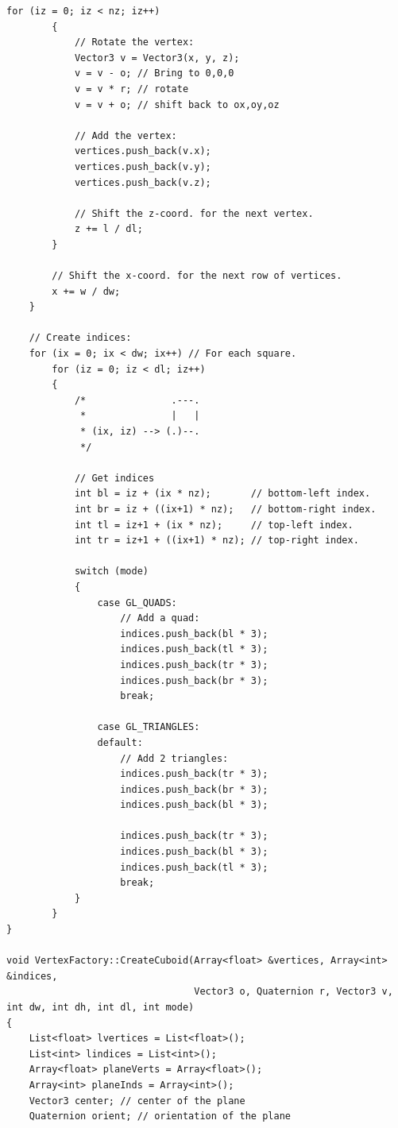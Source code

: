 \begin{lstlisting}[caption= The \texttt{VertexFactory} class]
        for (iz = 0; iz < nz; iz++) 
        {
            // Rotate the vertex:
            Vector3 v = Vector3(x, y, z);
            v = v - o; // Bring to 0,0,0
            v = v * r; // rotate
            v = v + o; // shift back to ox,oy,oz
            
            // Add the vertex:
            vertices.push_back(v.x);
            vertices.push_back(v.y);
            vertices.push_back(v.z);
            
            // Shift the z-coord. for the next vertex.
            z += l / dl;
        }
        
        // Shift the x-coord. for the next row of vertices.
        x += w / dw;
    }
    
    // Create indices:
    for (ix = 0; ix < dw; ix++) // For each square.
        for (iz = 0; iz < dl; iz++)
        {
            /*               .---.
             *               |   |
             * (ix, iz) --> (.)--.
             */
            
            // Get indices
            int bl = iz + (ix * nz);       // bottom-left index.
            int br = iz + ((ix+1) * nz);   // bottom-right index.
            int tl = iz+1 + (ix * nz);     // top-left index.
            int tr = iz+1 + ((ix+1) * nz); // top-right index.
            
            switch (mode) 
            {
                case GL_QUADS:
                    // Add a quad:
                    indices.push_back(bl * 3);
                    indices.push_back(tl * 3);
                    indices.push_back(tr * 3);
                    indices.push_back(br * 3);
                    break;
            
                case GL_TRIANGLES:
                default:
                    // Add 2 triangles:
                    indices.push_back(tr * 3);
                    indices.push_back(br * 3);
                    indices.push_back(bl * 3);
                    
                    indices.push_back(tr * 3);
                    indices.push_back(bl * 3);
                    indices.push_back(tl * 3);
                    break;
            }
        }
}

void VertexFactory::CreateCuboid(Array<float> &vertices, Array<int> &indices,
                                 Vector3 o, Quaternion r, Vector3 v, int dw, int dh, int dl, int mode)
{
    List<float> lvertices = List<float>();
    List<int> lindices = List<int>();
    Array<float> planeVerts = Array<float>();
    Array<int> planeInds = Array<int>();
    Vector3 center; // center of the plane
    Quaternion orient; // orientation of the plane
    

\end{lstlisting}
